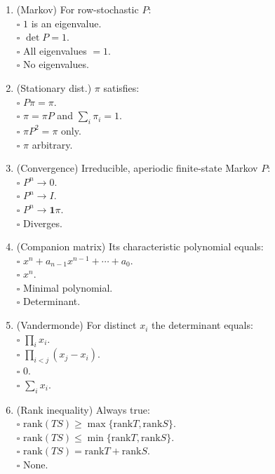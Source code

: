\documentclass[11pt]{article}
\begin{document}
\begin{enumerate}
\item (Markov) For row-stochastic $P$:\\
\(\square\) $1$ is an eigenvalue.\\
\(\square\) $\det P=1$.\\
\(\square\) All eigenvalues $=1$.\\
\(\square\) No eigenvalues.

\item (Stationary dist.) $\pi$ satisfies:\\
\(\square\) $P\pi=\pi$.\\
\(\square\) $\pi=\pi P$ and $\sum_i\pi_i=1$.\\
\(\square\) $\pi P^2=\pi$ only.\\
\(\square\) $\pi$ arbitrary.

\item (Convergence) Irreducible, aperiodic finite-state Markov $P$:\\
\(\square\) $P^n\to 0$.\\
\(\square\) $P^n\to I$.\\
\(\square\) $P^n\to \mathbf{1}\pi$.\\
\(\square\) Diverges.

\item (Companion matrix) Its characteristic polynomial equals:\\
\(\square\) $x^n+a_{n-1}x^{n-1}+\cdots+a_0$.\\
\(\square\) $x^n$.\\
\(\square\) Minimal polynomial.\\
\(\square\) Determinant.

\item (Vandermonde) For distinct $x_i$ the determinant equals:\\
\(\square\) $\prod_i x_i$.\\
\(\square\) $\prod_{i<j}(x_j-x_i)$.\\
\(\square\) $0$.\\
\(\square\) $\sum_i x_i$.

\item (Rank inequality) Always true:\\
\(\square\) $\mathrm{rank}(TS)\ge \max\{\mathrm{rank} T,\mathrm{rank} S\}$.\\
\(\square\) $\mathrm{rank}(TS)\le \min\{\mathrm{rank} T,\mathrm{rank} S\}$.\\
\(\square\) $\mathrm{rank}(TS)=\mathrm{rank} T+\mathrm{rank} S$.\\
\(\square\) None.


\end{enumerate}
\end{document}
